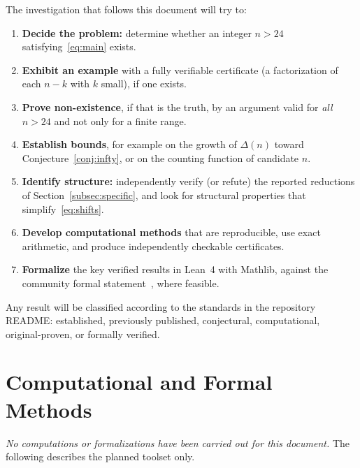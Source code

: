 \documentclass[11pt]{amsart}
\theoremstyle{plain}
\theoremstyle{definition}
\theoremstyle{remark}
\numberwithin{equation}{section}
\newcommand{\Dl}{\Delta}        %
\begin{document}
The investigation that follows this document will try to:

\begin{enumerate}[label=\textbf{O\arabic*.}, leftmargin=*]
  \item \textbf{Decide the problem:} determine whether an integer $n>24$ satisfying~\eqref{eq:main} exists.
  \item \textbf{Exhibit an example} with a fully verifiable certificate (a factorization of each $n-k$ with $k$ small), if one exists.
  \item \textbf{Prove non-existence}, if that is the truth, by an argument valid for \emph{all} $n>24$ and not only for a finite range.
  \item \textbf{Establish bounds}, for example on the growth of $\Dl(n)$ toward Conjecture~\ref{conj:infty}, or on the counting function of candidate $n$.
  \item \textbf{Identify structure:} independently verify (or refute) the reported reductions of Section~\ref{subsec:specific}, and look for structural properties that simplify~\eqref{eq:shifts}.
  \item \textbf{Develop computational methods} that are reproducible, use exact arithmetic, and produce independently checkable certificates.
  \item \textbf{Formalize} the key verified results in Lean~4 with Mathlib, against the community formal statement~\cite{FormalConjectures647}, where feasible.
\end{enumerate}

Any result will be classified according to the standards in the repository README: established, previously published, conjectural, computational, original-proven, or formally verified.

\section{Computational and Formal Methods}\label{sec:methods}

\emph{No computations or formalizations have been carried out for this document.} The following describes the planned toolset only.
\end{document}

